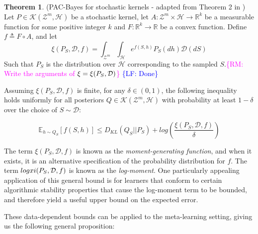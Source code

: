 \documentclass{article}
\theoremstyle{definition}
\newtheorem{theorem}{Theorem}[section]
\newcommand{\Expect}[2]{\mathbb{E}_{#1}\left [#2 \right ]}
\newcommand{\RM}[1]{\textcolor{magenta}{\{RM: #1\}}}
\newcommand{\LF}[1]{\textcolor{blue}{\{LF: #1\}}}
\begin{document}
\begin{theorem} (PAC-Bayes for stochastic kernels - adapted from Theorem 2 in \citet{Rivasplata2020}) \label{thm:rivasplata-pb}
	Let $P\in \mathcal{K}(\mathcal{Z}^m, \mathcal{H})$ be a stochastic kernel, let $A: \mathcal{Z}^m\times \mathcal{H}\rightarrow \mathbb{R}^k$ be a measurable function for some positive integer $k$ and $F:\mathbb{R}^k\rightarrow \mathbb{R}$ be a convex function.
	Define $f\triangleq F\circ A$, and let 
	$$\xi(P_S, \mathcal{D}, f)=\int_{\mathcal{Z}^m}\int_{\mathcal{H}}e^{f(S, h)}P_S(dh)\mathcal{D}(dS)$$
	Such that $P_S$ is the distribution over $\mathcal{H}$ corresponding to the sampled $S$.\RM{Write the arguments of $\xi=\xi(P_S,{\cal D})$} \LF{Done}
	
	Assuming $\xi(P_S, \mathcal{D}, f)$ is finite, for any $\delta \in (0,1)$, the following inequality holds uniformly for all posteriors $Q\in \mathcal{K}(\mathcal{Z}^m, \mathcal{H})$ with probability at least $1-\delta$ over the choice of $S\sim \mathcal{D}$:
	
	\begin{equation} \label{eq:ribasplata-pb}
	\Expect{h\sim Q_S}{f(S, h)} \leq D_{KL}(Q_S||P_S)+log\left (\frac{\xi(P_S, \mathcal{D}, f)}{\delta}\right )
	\end{equation}
\end{theorem}

The term $\xi(P_S, \mathcal{D}, f)$ is known as the \emph{moment-generating function}, and when it exists, it is an alternative specification of the probability distribution for $f$.
The term $log\\xi(P_S, \mathcal{D}, f)$ is known as the \emph{log-moment}. One particularly appealing application of this general bound is for learners that conform to certain algorithmic stability properties that cause the log-moment term to be bounded, and therefore yield a useful upper bound on the expected error.

These data-dependent bounds can be applied to the meta-learning setting, giving us the following general proposition:
\end{document}
